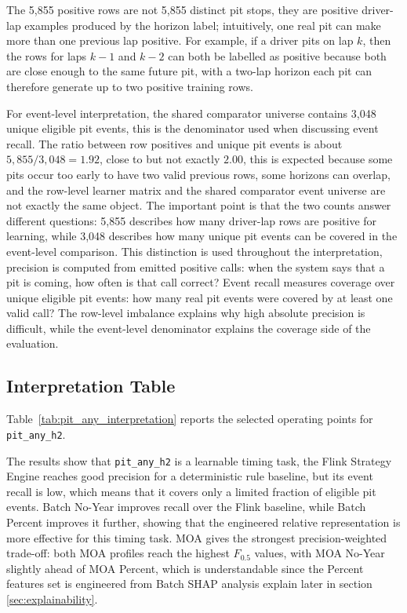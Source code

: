 The 5,855 positive rows are not 5,855 distinct pit stops, they are positive driver-lap examples produced by the horizon label; intuitively, one
real pit can make more than one previous lap positive. For example, if a driver pits on lap $k$, then the rows for laps $k-1$ and $k-2$ can both be labelled as
positive because both are close enough to the same future pit, with a two-lap horizon each pit can therefore generate up to two positive training rows.

For event-level interpretation, the shared comparator universe contains 3,048 unique eligible pit events, this is the denominator used when discussing event
recall. The ratio between row positives and unique pit events is about $5,855/3,048=1.92$, close to but not exactly $2.00$, this is expected because some pits occur
too early to have two valid previous rows, some horizons can overlap, and the row-level learner matrix and the shared comparator event universe are not exactly
the same object. The important point is that the two counts answer different questions: 5,855 describes how many driver-lap rows are positive for learning, while
3,048 describes how many unique pit events can be covered in the event-level comparison.
This distinction is used throughout the interpretation, precision is computed from emitted positive calls: when the system says that a pit is coming, how often is
that call correct? Event recall measures coverage over unique eligible pit events: how many real pit events were covered by at least one valid call? The row-level
imbalance explains why high absolute precision is difficult, while the event-level denominator explains the coverage side of the evaluation.

\subsection{Interpretation Table}

Table~\ref{tab:pit_any_interpretation} reports the selected operating points for \texttt{pit\_any\_h2}.

The results show that \texttt{pit\_any\_h2} is a learnable timing task, the Flink Strategy Engine reaches good precision for a deterministic rule baseline, but its event
recall is low, which means that it covers only a limited fraction of eligible pit events. Batch No-Year improves recall over the Flink baseline, while Batch Percent
improves it further, showing that the engineered relative representation is more effective for this timing task. MOA gives the strongest precision-weighted trade-off:
both MOA profiles reach the highest $F_{0.5}$ values, with MOA No-Year slightly ahead of MOA Percent, which is understandable since the Percent features set is engineered from
Batch SHAP analysis explain later in section \ref{sec:explainability}.

